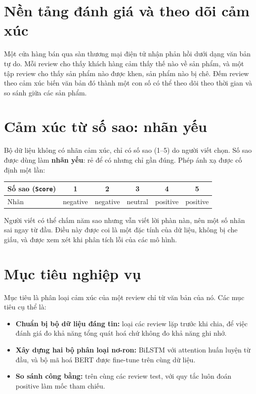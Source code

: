 \section{Nền tảng đánh giá và theo dõi cảm xúc}
\label{sec:2-1}

Một cửa hàng bán qua sàn thương mại điện tử nhận phản hồi dưới dạng văn bản tự do. Mỗi review cho thấy khách hàng cảm thấy thế nào về sản phẩm, và một tập review cho thấy sản phẩm nào được khen, sản phẩm nào bị chê. Đếm review theo cảm xúc biến văn bản đó thành một con số có thể theo dõi theo thời gian và so sánh giữa các sản phẩm.

\section{Cảm xúc từ số sao: nhãn yếu}
\label{sec:2-2}

Bộ dữ liệu không có nhãn cảm xúc, chỉ có số sao (1--5) do người viết chọn. Số sao được dùng làm \textbf{nhãn yếu}: rẻ để có nhưng chỉ gần đúng. Phép ánh xạ được cố định một lần:

\begin{center}
\begin{tabular}{@{}lccccc@{}}
    \toprule
    Số sao (\texttt{Score}) & 1 & 2 & 3 & 4 & 5 \\
    \midrule
    Nhãn & negative & negative & neutral & positive & positive \\
    \bottomrule
\end{tabular}
\end{center}

Người viết có thể chấm năm sao nhưng vẫn viết lời phàn nàn, nên một số nhãn sai ngay từ đầu. Điều này được coi là một đặc tính của dữ liệu, không bị che giấu, và được xem xét khi phân tích lỗi của các mô hình.

\section{Mục tiêu nghiệp vụ}
\label{sec:2-3}

Mục tiêu là phân loại cảm xúc của một review chỉ từ văn bản của nó. Các mục tiêu cụ thể là:

\begin{itemize}
    \item \textbf{Chuẩn bị bộ dữ liệu đáng tin:} loại các review lặp trước khi chia, để việc đánh giá đo khả năng tổng quát hoá chứ không đo khả năng ghi nhớ.
    \item \textbf{Xây dựng hai bộ phân loại nơ-ron:} BiLSTM với attention huấn luyện từ đầu, và bộ mã hoá BERT được fine-tune trên cùng dữ liệu.
    \item \textbf{So sánh công bằng:} trên cùng các review test, với quy tắc luôn đoán positive làm mốc tham chiếu.
\end{itemize}

